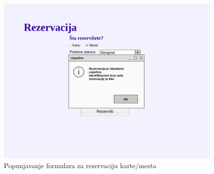 \begin{description}
\begin{figure}[h!tb]
	\includegraphics[width=1.2\linewidth]{../Slike/Veb/rezervacijapopup.png}
	\caption{Popunjavanje formulara za rezervaciju karte/mesta}
	\label{fig:pocetna}
\end{figure}

\end{description}
\newpage
